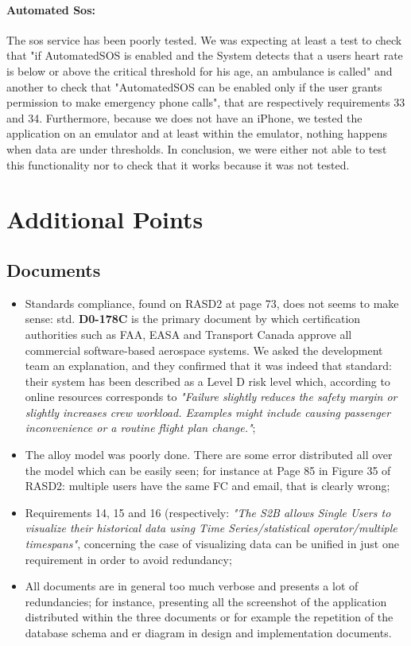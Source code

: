 \documentclass[a4paper]{article}
\begin{document}
\paragraph{Automated Sos:}
The sos service has been poorly tested. We was expecting at least a test to check that "if AutomatedSOS is enabled and the System detects that a users heart rate is below or above the critical threshold for his age, an ambulance is called" and another to check that "AutomatedSOS can be enabled only if the user grants permission to make emergency phone calls", that are respectively requirements 33 and 34. Furthermore, because we does not have an iPhone, we tested the application on an emulator and at least within the emulator, nothing happens when data are under thresholds. In conclusion, we were either not able to test this functionality nor to check that it works because it was not tested.

\newpage
\section{Additional Points}
\subsection{Documents}
\begin{itemize}
    \item Standards compliance, found on RASD2 at page 73, does not seems to make sense: std. \textbf{D0-178C} is the primary document by which certification authorities such as FAA, EASA and Transport Canada approve all commercial software-based aerospace systems. We asked the development team an explanation, and they confirmed that it was indeed that standard: their system has been described as a Level D risk level which, according to online resources corresponds to \textit{"Failure slightly reduces the safety margin or slightly increases crew workload. Examples might include causing passenger inconvenience or a routine flight plan change."};
    
    \item The alloy model was poorly done. There are some error distributed all over the model which can be easily seen; for instance at Page 85 in Figure 35 of RASD2: multiple users have the same FC and email, that is clearly wrong;
    
    \item Requirements 14, 15 and 16 (respectively: \textit{"The S2B allows Single Users to visualize their historical data using Time Series/statistical operator/multiple timespans"}, concerning the case of visualizing data can be unified in just one requirement in order to avoid redundancy;
    
    \item All documents are in general too much verbose and presents a lot of redundancies; for instance, presenting all the screenshot of the application distributed within the three documents or for example the repetition of the database schema and er diagram in design and implementation documents.
\end{itemize}
\end{document}
